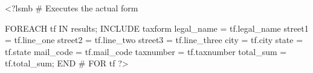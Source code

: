 \documentclass[usletter]{article}
\begin{document}
<?lsmb
  # Executes the actual form

   FOREACH tf IN results;
     INCLUDE taxform
       legal_name = tf.legal_name
       street1 = tf.line_one
       street2 = tf.line_two
       street3 = tf.line_three
       city = tf.city
       state = tf.state
       mail_code = tf.mail_code
       taxnumber = tf.taxnumber
       total_sum = tf.total_sum;
   END # FOR tf  ?>
\end{document}

